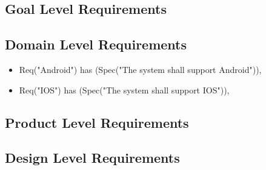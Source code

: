 \documentclass[a4paper]{article}
\begin{document}
		\subsection{Goal Level Requirements}
		\subsection{Domain Level Requirements}
		\begin{itemize}
			\item 	Req("Android") has (Spec("The system shall support Android")),
			\item	Req("IOS") has (Spec("The system shall support IOS")),
		\end{itemize}
		\subsection{Product Level Requirements}
					
		\subsection{Design Level Requirements}	
	
\end{document}
